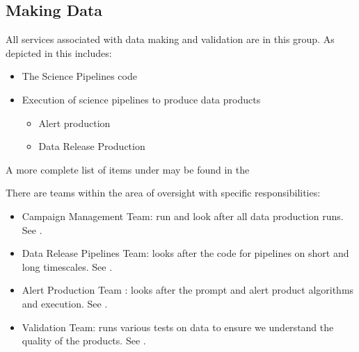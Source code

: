 \subsection{Making Data} \label{sec:makingdata}

All services associated with data making and validation  are in this group.
As depicted in  this includes:

\begin{itemize}
\item The Science Pipelines code

\item Execution of science pipelines to produce data products
\begin{itemize}
\item Alert production
\item Data Release Production
\end{itemize}
\end{itemize}

A more complete list of items under may be found in the 

There are teams within the area of oversight  with specific responsibilities:
\begin{itemize}
\item Campaign Management Team: run and look after all data production runs. See .
\item Data Release Pipelines Team: looks after the code for pipelines on short and long timescales. See .
\item Alert Production Team : looks after the prompt and alert product algorithms and execution. See .
\item Validation Team: runs various tests on data to ensure we understand the quality of the products. See .
\end{itemize}
